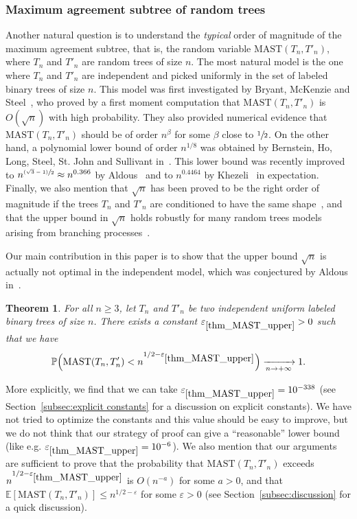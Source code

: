 \documentclass[JEP,XML,SOM,Unicode,NoFloatCountersInSection,published]{cedram}
\newcommand{\psfrac}[2]{\sfrac{(#1)}{#2}}
\newcommand{\Ec}[1]{\mathbb{E} \left[#1\right]}
\newcommand{\BPp}[1]{\mathbb{P} \Bigl(#1\Bigr)}
\newcommand{\MAST}{\mathrm{MAST}}
\let\eps\varepsilon
\theoremstyle{plain}
\newtheorem{theorem}{Theorem}
\theoremstyle{definition}
\begin{document}
\subsubsection*{Maximum agreement subtree of random trees}
Another natural question is to understand the \emph{typical} order of magnitude of the maximum agreement subtree, that is, the random variable $\MAST(T_n, T'_n)$, where $T_n$ and $T'_n$ are random trees of size $n$.
The most natural model is the one where $T_n$ and $T'_n$ are independent and picked uniformly in the set of labeled binary trees of size $n$.
This model was first investigated by Bryant, McKenzie and Steel~\cite{bryant_size_2003}, who proved by a first moment computation that $\MAST(T_n, T'_n)$ is $O(\sqrt{n})$ with high probability.
They also provided numerical evidence that $\MAST(T_n, T'_n)$ should be of order $n^{\beta}$ for some $\beta$ close to $\sfrac{1}{2}$.
On the other hand, a polynomial lower bound of order $n^{1/8}$ was obtained by Bernstein, Ho, Long, Steel, St. John and Sullivant in~\cite{bernstein_bounds_2015}. This lower bound was recently improved to $n^{\psfrac{\sqrt{3}-1}{2}}\approx n^{0.366}$ by Aldous~\cite{aldous_largest_2022} and to $n^{0.4464}$ by Khezeli~\cite{Khez22} in expectation. Finally, we also mention that $\sqrt{n}$ has been proved to be the right order of magnitude if the trees $T_n$ and $T'_n$ are conditioned to have the same shape~\cite{misra_bounds_2019}, and that the upper bound in $\sqrt{n}$ holds robustly for many random trees models arising from branching processes~\cite{Pit23}.

Our main contribution in this paper is to show that the upper bound $\sqrt{n}$ is actually not optimal in the independent model, which was conjectured by Aldous in~\cite{aldous_largest_2022}.

\begin{theorem}\label{thm_MAST_upper}
For all $n \geq 3$, let $T_n$ and $T'_n$ be two independent uniform labeled binary trees of size $n$. There exists a constant $\eps_{\ref{thm_MAST_upper}}>0$ such that we have
\[ \BPp{\MAST (T_n,T'_n) < n^{1/2-\eps_{\ref{thm_MAST_upper}}}} \xrightarrow[n \to +\infty]{} 1.\]
\end{theorem}

More explicitly, we find that we can take $\eps_{\ref{thm_MAST_upper}}=10^{-338}$ (see Section~\ref{subsec:explicit constants} for a discussion on explicit constants). We have not tried to optimize the constants and this value should be easy to improve, but we do not think that our strategy of proof can give a ``reasonable'' lower bound (like e.g. $\eps_{\ref{thm_MAST_upper}}=10^{-6}$). We also mention that our arguments are sufficient to prove that the probability that $\MAST(T_n,T'_n)$ exceeds $n^{1/2-\eps_{\ref{thm_MAST_upper}}}$ is $O(n^{-a})$ for some $a>0$, and that $\Ec{\MAST(T_n,T'_n)} \leq n^{1/2-\eps}$ for some $\eps>0$ (see Section~\ref{subsec:discussion} for a quick discussion).
\end{document}
